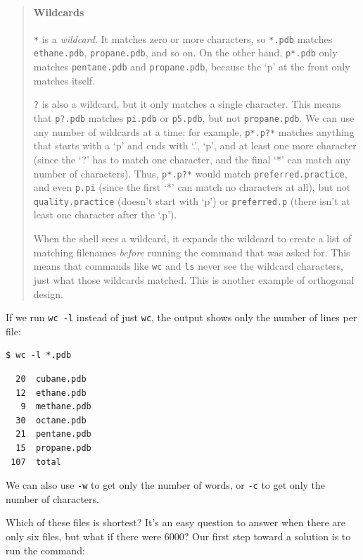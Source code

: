\documentclass[]{book}
\newcommand{\gdef}[2]{\emph{#2}}
\begin{document}
\begin{quote}
\mbox{}\paragraph{Wildcards}

\texttt{*} is a \gdef{g:wildcard}{wildcard}. It matches zero or more
characters, so \texttt{*.pdb} matches \texttt{ethane.pdb},
\texttt{propane.pdb}, and so on. On the other hand, \texttt{p*.pdb} only
matches \texttt{pentane.pdb} and \texttt{propane.pdb}, because the `p'
at the front only matches itself.

\texttt{?} is also a wildcard, but it only matches a single character.
This means that \texttt{p?.pdb} matches \texttt{pi.pdb} or
\texttt{p5.pdb}, but not \texttt{propane.pdb}. We can use any number of
wildcards at a time: for example, \texttt{p*.p?*} matches anything that
starts with a `p' and ends with `.', `p', and at least one more
character (since the `?' has to match one character, and the final `*'
can match any number of characters). Thus, \texttt{p*.p?*} would match
\texttt{preferred.practice}, and even \texttt{p.pi} (since the first `*'
can match no characters at all), but not \texttt{quality.practice}
(doesn't start with `p') or \texttt{preferred.p} (there isn't at least
one character after the `.p').

When the shell sees a wildcard, it expands the wildcard to create a list
of matching filenames \emph{before} running the command that was asked
for. This means that commands like \texttt{wc} and \texttt{ls} never see
the wildcard characters, just what those wildcards matched. This is
another example of orthogonal design.
\end{quote}

If we run \texttt{wc -l} instead of just \texttt{wc}, the output shows
only the number of lines per file:

\begin{verbatim}
$ wc -l *.pdb
\end{verbatim}

\begin{verbatim}
  20  cubane.pdb
  12  ethane.pdb
   9  methane.pdb
  30  octane.pdb
  21  pentane.pdb
  15  propane.pdb
 107  total
\end{verbatim}

We can also use \texttt{-w} to get only the number of words, or
\texttt{-c} to get only the number of characters.

Which of these files is shortest? It's an easy question to answer when
there are only six files, but what if there were 6000? Our first step
toward a solution is to run the command:
\end{document}
